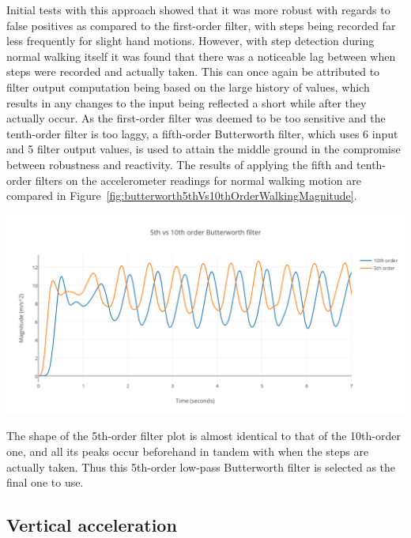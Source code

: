 \documentclass[12pt,a4paper]{report}
\begin{document}
Initial tests with this approach showed that it was more robust with regards to false positives as compared to the first-order filter, with steps being recorded far less frequently for slight hand motions. However, with step detection during normal walking itself it was found that there was a noticeable lag between when steps were recorded and actually taken. This can once again be attributed to filter output computation being based on the large history of values, which results in any changes to the input being reflected a short while after they actually occur. As the first-order filter was deemed to be too sensitive and the tenth-order filter is too laggy, a fifth-order Butterworth filter, which uses 6 input and 5 filter output values, is used to attain the middle ground in the compromise between robustness and reactivity. The results of applying the fifth and tenth-order filters on the accelerometer readings for normal walking motion are compared in Figure~\ref{fig:butterworth5thVs10thOrderWalkingMagnitude}.  

\begin{center}
\includegraphics[scale=0.9]{images/butterworth5thVs10thOrderWalkingMagnitude.png}
\label{fig:butterworth5thVs10thOrderWalkingMagnitude}
\end{center}

The shape of the 5th-order filter plot is almost identical to that of the 10th-order one, and all its peaks occur beforehand in tandem with when the steps are actually taken. Thus this 5th-order low-pass Butterworth filter is selected as the final one to use. 

\subsection{Vertical acceleration}
\end{document}
